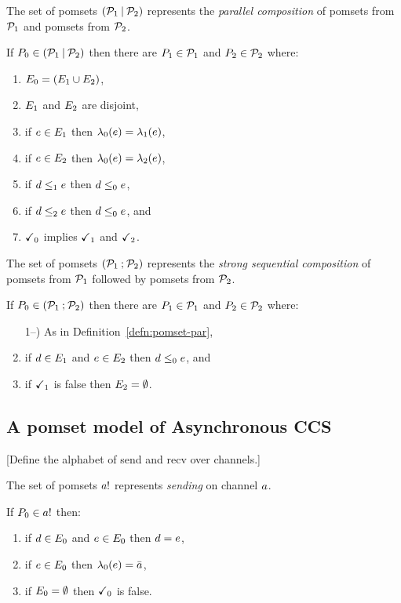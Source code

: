 The set of pomsets $(\mathcal{P}_1\mathbin{\mid}\mathcal{P}_2)$ represents the \emph{parallel composition} of pomsets from
$\mathcal{P}_1$ and pomsets from $\mathcal{P}_2$.
\begin{definition}
  \label{defn:pomset-par}
  If $P_0 \in (\mathcal{P}_1\mathbin{\mid}\mathcal{P}_2)$ then
  there are $P_1\in\mathcal{P}_1$ and $P_2\in\mathcal{P}_2$ where:
  \begin{enumerate}
  \item $E_0 = (E_1\cup E_2)$,
  \item $E_1$ and  $E_2$ are disjoint,
  \item if $e\in E_1$ then $\lambda_0(e) = \lambda_1(e)$, 
  \item if $e\in E_2$ then $\lambda_0(e) = \lambda_2(e)$,
  \item if $d\le_1e$ then $d\le_0e$,
  \item if $d\le_2e$ then $d\le_0e$, and
  \item $\checkmark_0$ implies $\checkmark_1$ and $\checkmark_2$.
    \setcounter{pomsetParCount}{\value{enumi}}
  \end{enumerate}
\end{definition}
 
The set of pomsets $(\mathcal{P}_1\mathbin{;}\mathcal{P}_2)$ represents the \emph{strong sequential composition} of pomsets from
$\mathcal{P}_1$ followed by pomsets from $\mathcal{P}_2$.
\begin{definition}
  If $P_0 \in (\mathcal{P}_1\mathbin{;}\mathcal{P}_2)$ then
  there are $P_1\in\mathcal{P}_1$ and $P_2\in\mathcal{P}_2$ where:
  \begin{enumerate}
    \setcounter{enumi}{\value{pomsetParCount}}
  \item[1--\thepomsetParCount)] As in Definition~\ref{defn:pomset-par},
  \item if $d\in E_1$ and $e\in E_2$ then $d\le_0e$, and
  \item if $\checkmark_1$ is false then $E_2=\emptyset$.
  \end{enumerate}
\end{definition}

\subsection{A pomset model of Asynchronous CCS}

[Define the alphabet of send and recv over channels.]

The set of pomsets $\sSEND\aChan{}$ represents \emph{sending} on channel $a$.
\begin{definition}
  If $\aPS_0 \in \sSEND\aChan{}$ then:
  \begin{enumerate}
  \item if $d\in E_0$ and $e\in E_0$ then $d=e$,
  \item if $e\in E_0$ then $\lambda_0(e) = \bar{a}_{}$,
  \item if $E_0=\emptyset$ then $\checkmark_0$ is false.
  \end{enumerate}
\end{definition}

